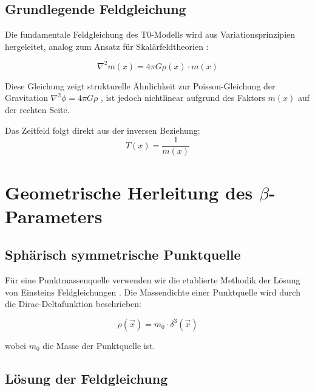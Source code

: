 \documentclass[12pt,a4paper]{article}
\begin{document}
	\subsection{Grundlegende Feldgleichung}
	\label{subsec:field_equation}
	
	Die fundamentale Feldgleichung des T0-Modells wird aus Variationsprinzipien hergeleitet, analog zum Ansatz für Skalärfeldtheorien \citep{weinberg1995}:
	
	\begin{equation}
		\label{eq:field_equation_fundamental}
		\nabla^2 m(x) = 4\pi G \rho(x) \cdot m(x)
	\end{equation}
	
	Diese Gleichung zeigt strukturelle Ähnlichkeit zur Poisson-Gleichung der Gravitation $\nabla^2 \phi = 4\pi G \rho$ \citep{jackson1998}, ist jedoch nichtlinear aufgrund des Faktors $m(x)$ auf der rechten Seite.
	
	Das Zeitfeld folgt direkt aus der inversen Beziehung:
	\begin{equation}
		\label{eq:time_field_definition}
		T(x) = \frac{1}{m(x)}
	\end{equation}
	
	\section{Geometrische Herleitung des $\beta$-Parameters}
	\label{sec:beta_derivation}
	
	\subsection{Sphärisch symmetrische Punktquelle}
	\label{subsec:spherical_solution}
	
	Für eine Punktmassenquelle verwenden wir die etablierte Methodik der Lösung von Einsteins Feldgleichungen \citep{schwarzschild1916,misner1973}. Die Massendichte einer Punktquelle wird durch die Dirac-Deltafunktion beschrieben:
	
	\begin{equation}
		\rho(\vec{x}) = m_0 \cdot \delta^3(\vec{x})
	\end{equation}
	
	wobei $m_0$ die Masse der Punktquelle ist.
	
	\subsection{Lösung der Feldgleichung}
	\label{subsec:field_solution}
	
\end{document}
